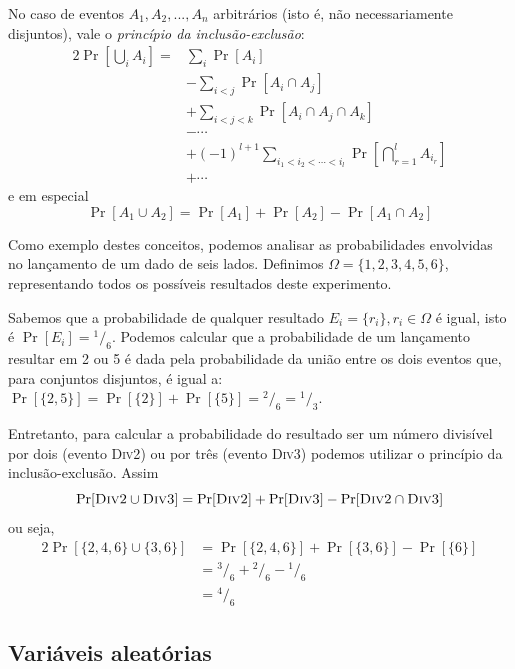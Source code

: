 No caso de eventos $A_1, A_2, ..., A_n$ arbitrários (isto é, não necessariamente disjuntos), vale o \emph{princípio da inclusão-exclusão}:
\begin{alignat*}{2}
    \Pr\left[ \bigcup_i A_i \right] = & \sum_i \Pr[A_i] \\
                                  & - \sum_{i<j} \Pr[A_i \cap A_j] \\
                                  & + \sum_{i<j<k} \Pr[A_i \cap A_j \cap A_k] \\
                                  & - \cdots \\
                                  & + (-1)^{l+1} \sum_{i_1 < i_2 < \cdots < i_l} \Pr \left[ \bigcap_{r=1}^{l} A_{i_r} \right] \\
                                  & + \cdots
\end{alignat*}
e em especial
\[
    \Pr[A_1 \cup A_2] = \Pr[A_1] + \Pr[A_2] - \Pr[A_1 \cap A_2]
\]

Como exemplo destes conceitos, podemos analisar as probabilidades envolvidas no lançamento de um dado de seis lados. Definimos $\Omega = \{1, 2, 3, 4, 5, 6\}$, representando todos os possíveis resultados deste experimento. 

Sabemos que a probabilidade de qualquer resultado $E_i = \{r_i\}, r_i \in \Omega$ é igual, isto é $\Pr[E_i] = {^{1}/_{6}}$. Podemos calcular que a probabilidade de um lançamento resultar em 2 ou 5 é dada pela probabilidade da união entre os dois eventos que, para conjuntos disjuntos, é igual a: $\Pr[\{2, 5\}] = \Pr[\{2\}] + \Pr[\{5\}] = {^2/_6} = {^1/_3}$.

Entretanto, para calcular a probabilidade do resultado ser um número divisível por dois (evento \textsc{Div2}) ou por três (evento \textsc{Div3}) podemos utilizar o princípio da inclusão-exclusão. Assim 
\[
\Pr[\textsc{Div2} \cup \textsc{Div3}] = \Pr[\textsc{Div2}] + \Pr[\textsc{Div3}] - \Pr[\textsc{Div2} \cap \textsc{Div3}]
\]
ou seja,
\begin{alignat*}{2}
\Pr[\{2,4,6\} \cup \{3,6\}] &= \Pr[\{2,4,6\}] + \Pr[\{3,6\}] - \Pr[\{6\}] \\
                            &= {^3/_6} + {^2/_6} - {^1/_6} \\
                            &= {^4/_6}
\end{alignat*}

\subsection{Variáveis aleatórias}

